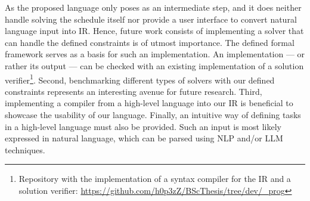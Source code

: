 As the proposed language only poses as an intermediate step, and it does neither handle solving the schedule itself nor provide a user interface to convert natural language input into \Ac{IR}. Hence, future work consists of implementing a solver that can handle the defined constraints is of utmost importance. The defined formal framework serves as a basis for such an implementation. An implementation --- or rather its output --- can be checked with an existing implementation of a solution verifier\footnote{Repository with the implementation of a syntax compiler for the \Ac{IR} and a solution verifier: \url{https://github.com/h0p3zZ/BScThesis/tree/dev/_prog}}. Second, benchmarking different types of solvers with our defined constraints represents an interesting avenue for future research. Third, implementing a compiler from a high-level language into our \ac{IR} is beneficial to showcase the usability of our language. Finally, an intuitive way of defining tasks in a high-level language must also be provided. Such an input is most likely expressed in natural language, which can be parsed using \Ac{NLP} and/or \ac{LLM} techniques.

